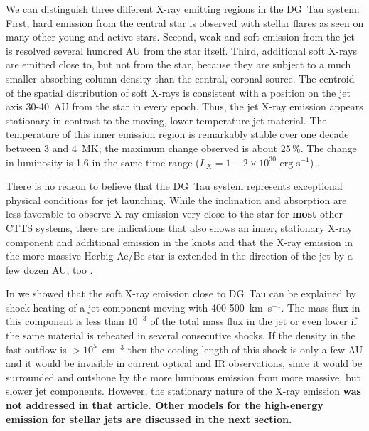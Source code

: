 \documentclass[manuscript]{aastex}
\begin{document}
We can distinguish three different X-ray emitting regions in the DG~Tau system: First, hard emission from the central star is observed with stellar flares as seen on many other young and active stars. Second, weak and soft emission from the jet is resolved several hundred AU from the star itself. Third, additional soft X-rays are emitted close to, but not from the star, because they are subject to a much smaller absorbing column density than the central, coronal source. The centroid of the spatial distribution of soft X-rays is consistent with a position on the jet axis 30-40~AU from the star \citep{2008A&A...488L..13S,2011ASPC..448..617G} in every epoch. Thus, the jet X-ray emission appears stationary in contrast to the moving, lower temperature jet material.  The temperature of this inner emission region is remarkably stable over one decade between 3 and 4~MK; the maximum change observed is about 25\,\%. The change in luminosity is 1.6 in the same time range ($L_X=1-2\times10^{30}\textrm{ erg s}^{-1}$) \citep{SchneiderDGTauXray}.

There is no reason to believe that the DG~Tau system represents exceptional physical conditions for jet launching. While the inclination and absorption are less favorable to observe X-ray emission very close to the star for \textbf{most} other CTTS systems, there are indications that  also shows an inner, stationary X-ray component and additional emission in the knots \citep{2011A&A...530A.123S,2011ApJ...737...54B} and that the X-ray emission in the more massive Herbig Ae/Be star  is extended in the direction of the jet by a few dozen AU, too \citep{2005ApJ...628..811S,2009A&A...494.1041G,2013A&A...552A.142G}.

In \citet{2009A&A...493..579G} we showed that the soft X-ray emission close to DG~Tau can be explained by shock heating of a jet component moving with 400-500~km~s$^{-1}$. The mass flux in this component is less than $10^{-3}$ of the total mass flux in the jet or even lower if the same material is reheated in several consecutive shocks. If the density in the fast outflow is $>10^5$~cm$^{-3}$ then the cooling length of this shock is only a few AU and it would be invisible in current optical and IR observations, since it would be surrounded and outshone by the more luminous emission from more massive, but slower jet components. However, the stationary nature of the X-ray emission \textbf{was not addressed in that article. Other models for the high-energy emission for stellar jets are discussed in the next section.}
\end{document}
